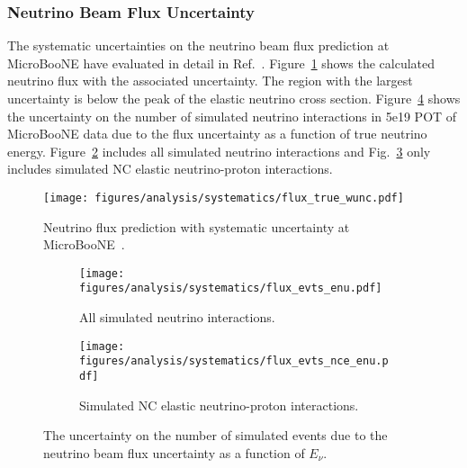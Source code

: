   \subsubsection{Neutrino Beam Flux Uncertainty}\label{sec:fluxuncertainty}
    The systematic uncertainties on the neutrino beam flux prediction at
    MicroBooNE have evaluated in detail in Ref.~\cite{uBFluxNote}.
    Figure~\ref{fig:ubflux} shows the calculated neutrino flux with the
    associated uncertainty. The region with the largest uncertainty is below
    the peak of the elastic neutrino cross section. Figure~\ref{fig:fluxq2}
    shows the uncertainty on the number of simulated neutrino interactions in
    5e19 POT of MicroBooNE data due to the flux uncertainty as a function of
    true neutrino energy. Figure~\ref{fig:fluxenuall} includes all simulated
    neutrino interactions and Fig.~\ref{fig:fluxenunce} only includes simulated
    NC elastic neutrino-proton interactions.
    \begin{figure}[ht]
      \centering
      \texttt{[image: figures/analysis/systematics/flux\_true\_wunc.pdf]}
      \caption{Neutrino flux prediction with systematic uncertainty at
      MicroBooNE~\cite{uBFluxNote}.}
      \label{fig:ubflux}
    \end{figure}
    \begin{figure}[h]
      \centering
      \begin{subfigure}[t]{2.8in}
        \texttt{[image: figures/analysis/systematics/flux\_evts\_enu.pdf]}
        \caption{All simulated neutrino interactions.}
        \label{fig:fluxenuall}
      \end{subfigure}
      \hspace{2pt}
      \begin{subfigure}[t]{2.8in}
        \texttt{[image: figures/analysis/systematics/flux\_evts\_nce\_enu.pdf]}
        \caption{Simulated NC elastic neutrino-proton interactions.}
        \label{fig:fluxenunce}
      \end{subfigure}
      \caption{The uncertainty on the number of simulated events due to the
      neutrino beam flux uncertainty as a function of $E_{\nu}$.}
      \label{fig:fluxq2}
    \end{figure}

